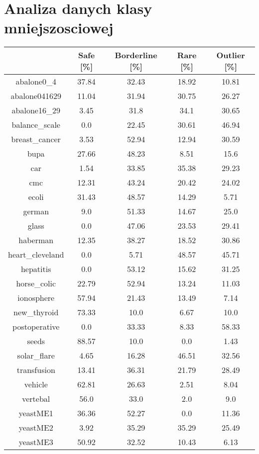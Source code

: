 \documentclass{article}%
\begin{document}
%
\normalsize%
\section*{Analiza danych klasy mniejszosciowej}%
\begin{tabular}{c|cccc}%
&Safe [\%]&Borderline [\%]&Rare [\%]&Outlier [\%]\\%
\hline%
abalone0\_4&37.84&32.43&18.92&10.81\\%
abalone041629&11.04&31.94&30.75&26.27\\%
abalone16\_29&3.45&31.8&34.1&30.65\\%
balance\_scale&0.0&22.45&30.61&46.94\\%
breast\_cancer&3.53&52.94&12.94&30.59\\%
bupa&27.66&48.23&8.51&15.6\\%
car&1.54&33.85&35.38&29.23\\%
cmc&12.31&43.24&20.42&24.02\\%
ecoli&31.43&48.57&14.29&5.71\\%
german&9.0&51.33&14.67&25.0\\%
glass&0.0&47.06&23.53&29.41\\%
haberman&12.35&38.27&18.52&30.86\\%
heart\_cleveland&0.0&5.71&48.57&45.71\\%
hepatitis&0.0&53.12&15.62&31.25\\%
horse\_colic&22.79&52.94&13.24&11.03\\%
ionosphere&57.94&21.43&13.49&7.14\\%
new\_thyroid&73.33&10.0&6.67&10.0\\%
postoperative&0.0&33.33&8.33&58.33\\%
seeds&88.57&10.0&0.0&1.43\\%
solar\_flare&4.65&16.28&46.51&32.56\\%
transfusion&13.41&36.31&21.79&28.49\\%
vehicle&62.81&26.63&2.51&8.04\\%
vertebal&56.0&33.0&2.0&9.0\\%
yeastME1&36.36&52.27&0.0&11.36\\%
yeastME2&3.92&35.29&35.29&25.49\\%
yeastME3&50.92&32.52&10.43&6.13\\%
\end{tabular}

%
\end{document}
